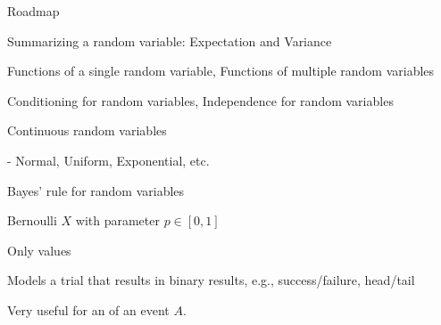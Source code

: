 \documentclass[fleqn,aspectratio=169]{beamer}
\begin{document}
\begin{frame}{Roadmap}

\plitemsep 0.1in

\bci [$\circ$]
\item {}

\item Summarizing a random variable: Expectation and Variance

\item Functions of a single random variable, Functions of multiple random variables 

\item Conditioning for random variables, Independence for random variables 

\item Continuous random variables

- Normal, Uniform, Exponential, etc. 

\item Bayes' rule for random variables
\eci 

\end{frame}



\begin{frame}{Bernoulli $X$ with parameter $p \in [0,1]$}

\plitemsep 0.1in

\bci
\item<1-> Only  values

\item<3-> Models a trial that results in binary results, e.g., success/failure, head/tail

\item<4-> Very useful for an  of an event $A.$ 
\eci 

\end{frame}
\end{document}
